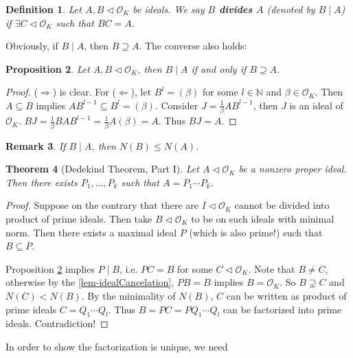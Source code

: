 \documentclass[11pt]{book}
\newtheorem{theorem}{Theorem}[section]
\newtheorem{definition}[theorem]{Definition}
\newtheorem{proposition}[theorem]{Proposition}
\newtheorem{remark}[theorem]{Remark}
\begin{document}
\begin{definition}
    Let $A, B\lhd \mathcal{O}_{K}$ be ideals. We say {\bf $B$ divides $A$} (denoted by $B\mid A$) if $\exists C\lhd \mathcal{O}_{K}$ such that $BC=A$. 
\end{definition}

Obviously, if $B\mid A$, then $B\supseteq A$. The converse also holds: 

\begin{proposition}\label{prop-inclusionEquivDivision}
    Let $A,B\lhd \mathcal{O}_{K}$, then $B\mid A$ if and only if $B\supseteq A$. 
\end{proposition}

\begin{proof}
    ($\Rightarrow$) is clear. For ($\Leftarrow$), let $B^{l}=(\beta)$ for some $l\in \mathbb{N}$ and $\beta\in \mathcal{O}_{K}$. Then $A\subseteq B$ implies $AB^{l-1}\subseteq B^{l}=(\beta)$. Consider $J=\frac{1}{\beta}AB^{l-1}$, then $J$ is an ideal of $\mathcal{O}_{K}$. $BJ=\frac{1}{\beta}BAB^{l-1}=\frac{1}{\beta}A(\beta)=A$. Thus $BJ=A$. 
\end{proof}

\begin{remark}
    If $B\mid A$, then $N(B)\leq N(A)$. 
\end{remark}

\begin{theorem}[Dedekind Theorem, Part I]
    Let $A\lhd \mathcal{O}_{K}$ be a nonzero proper ideal. Then there exists $P_{1},\dots, P_{k}$ such that $A=P_{1}\cdots P_{k}$. 
\end{theorem}

\begin{proof}
    Suppose on the contrary that there are $I\lhd \mathcal{O}_{K}$ cannot be divided into product of prime ideals. Then take $B\lhd \mathcal{O}_{K}$ to be on such ideals with minimal norm. Then there exists a maximal ideal $P$ (which is also prime!) such that $B\subseteq P$.  

    Proposition \ref{prop-inclusionEquivDivision} implies $P\mid B$, i.e. $PC=B$ for some $C\lhd \mathcal{O}_{K}$. Note that $B\neq C$, otherwise by the \ref{lem-idealCancelation}, $PB=B$ implies $B=\mathcal{O}_{K}$. So $B\supsetneq C$ and $N(C)<N(B)$. By the minimality of $N(B)$, $C$ can be written as product of prime ideals $C=Q_{1}\cdots Q_{l}$. Thus $B=PC=PQ_{1}\cdots Q_{l}$ can be factorized into prime ideals. Contradiction! 
\end{proof}

In order to show the factorization is unique, we need 
\end{document}
